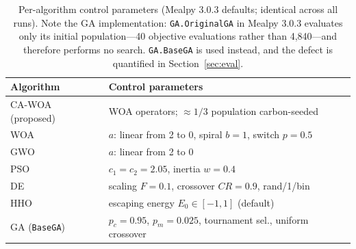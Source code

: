 \documentclass[12pt,a4paper]{article}
\providecommand{\DIFaddbegin}{} %
\providecommand{\DIFaddend}{} %
\providecommand{\DIFdelbegin}{} %
\providecommand{\DIFdelend}{} %
\providecommand{\DIFscaledelfig}{0.5}
\newlength{\DIFdelgraphicswidth} %
\newlength{\DIFdelgraphicsheight} %
\providecommand{\DIFaddincludegraphics}[2][]{{\color{blue}\fbox{\DIFOincludegraphics[#1]{#2}}}} %
\providecommand{\DIFdelincludegraphics}[2][]{%
\sbox{\DIFdelgraphicsbox}{\DIFOincludegraphics[#1]{#2}}%
\settoboxwidth{\DIFdelgraphicswidth}{\DIFdelgraphicsbox} %
\settoboxtotalheight{\DIFdelgraphicsheight}{\DIFdelgraphicsbox} %
\scalebox{\DIFscaledelfig}{%
\parbox[b]{\DIFdelgraphicswidth}{\usebox{\DIFdelgraphicsbox}\\[-\baselineskip] \rule{\DIFdelgraphicswidth}{0em}}\llap{\resizebox{\DIFdelgraphicswidth}{\DIFdelgraphicsheight}{%
\setlength{\unitlength}{\DIFdelgraphicswidth}%
\begin{picture}(1,1)%
\thicklines\linethickness{2pt} %
{\color[rgb]{1,0,0}\put(0,0){\framebox(1,1){}}}%
{\color[rgb]{1,0,0}\put(0,0){\line( 1,1){1}}}%
{\color[rgb]{1,0,0}\put(0,1){\line(1,-1){1}}}%
\end{picture}%
}\hspace*{3pt}}} %
} %
\DeclareRobustCommand{\DIFaddbegin}{\DIFOaddbegin \let\includegraphics\DIFaddincludegraphics} %
\DeclareRobustCommand{\DIFaddend}{\DIFOaddend \let\includegraphics\DIFOincludegraphics} %
\DeclareRobustCommand{\DIFdelbegin}{\DIFOdelbegin \let\includegraphics\DIFdelincludegraphics} %
\DeclareRobustCommand{\DIFdelend}{\DIFOaddend \let\includegraphics\DIFOincludegraphics} %
\begin{document}
\DIFdelbegin %
\DIFdelend \DIFaddbegin \begin{table}[H]\centering \footnotesize
\caption{Per-algorithm control parameters (Mealpy 3.0.3 defaults; identical across all runs). Note the GA
implementation: \texttt{GA.OriginalGA} in Mealpy 3.0.3 evaluates only its initial population---40 objective
evaluations rather than 4{,}840---and therefore performs no search. \texttt{GA.BaseGA} is used instead, and
the defect is quantified in Section~\ref{sec:eval}.}\label{tab:hyper}
\begin{tabular}{@{}ll@{}}
\toprule Algorithm & Control parameters \\ \midrule
CA-WOA (proposed) & WOA operators; $\approx\!1/3$ population carbon-seeded \\
WOA & $a$: linear from 2 to 0, spiral $b=1$, switch $p=0.5$ \\
GWO & $a$: linear from 2 to 0 \\
PSO & $c_1=c_2=2.05$, inertia $w=0.4$ \\
DE & scaling $F=0.1$, crossover $CR=0.9$, rand/1/bin \\
HHO & escaping energy $E_0\in[-1,1]$ (default) \\
GA (\texttt{BaseGA}) & $p_c=0.95$, $p_m=0.025$, tournament sel., uniform crossover \\
\bottomrule
\end{tabular}
\end{table}
\DIFaddend 
\end{document}
